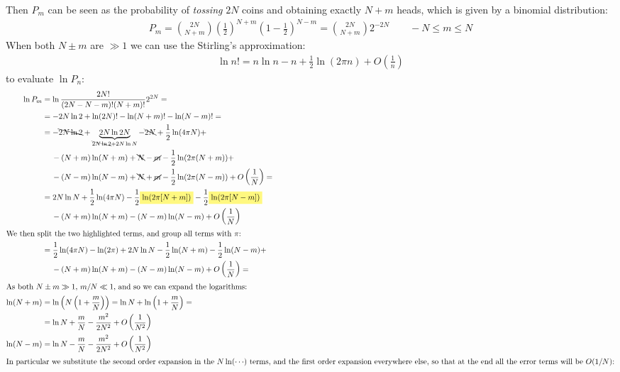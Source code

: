\documentclass[../../main.tex]{subfiles}
\begin{document}
Then $P_m$ can be seen as the probability of \textit{tossing} $2N$ coins and obtaining exactly $N+m$ heads, which is given by a binomial distribution:
\begin{align}\label{eqn:m-binomial}
    P_m = {2N \choose N+m} \left(\frac{1}{2} \right)^{N+m} \left(1-\frac{1}{2} \right)^{N-m} = {2N \choose N+m} 2^{-2N} \qquad -N \leq m \leq N 
\end{align}  
 When both $N\pm m$ are $\gg 1$ we can use the Stirling's approximation:
\begin{align}\label{eqn:stirling1}
    \ln n! = n \ln n - n  +\frac{1}{2} \ln (2 \pi n)  + O\left(\frac{1}{n} \right)
\end{align}
to evaluate $\ln P_n$:
\begin{align*}
    \ln P_m &= \ln \frac{2N!}{(2N-N-m)!(N+m)!} 2^{2N} =\\ 
    &= - 2N \ln 2 + \ln (2N)! - \ln (N+m)! - \ln (N-m)! = \\
    &= -\bcancel{2N \ln 2} + \underbrace{2 N \ln 2N}_{\bcancel{2 N \ln 2} + 2N\ln N} -\bcancel{ 2N} + \frac{1}{2} \ln(4 \pi N) +\\
    &\quad \> -(N+m)\ln(N+m) + \bcancel{N}-\cancel{m} - \frac{1}{2}\ln(2\pi(N+m)) + \\
    &\quad \> -(N-m) \ln(N-m) +\bcancel{N}+\cancel{m} - \frac{1}{2} \ln(2\pi(N-m)) + O\left(\frac{1}{N} \right)= \\
    &= 2 N \ln N + \frac{1}{2} \ln(4 \pi N) - \frac{1}{2} \hlc{Yellow}{\ln(2\pi[N+m])} - \frac{1}{2} \hlc{Yellow}{\ln(2\pi[N-m])}   \\
    &\quad \> -(N+m) \ln (N+m) - (N-m) \ln(N-m) + O\left(\frac{1}{N} \right)\\
\shortintertext{We then split the two highlighted terms, and group all terms with $\pi$:}
    &=\frac{1}{2} \ln(4 \pi N) - \ln(2 \pi) + 2 N \ln N - \frac{1}{2} \ln(N+m) -\frac{1}{2}\ln(N-m)+\\
    &\quad \> -(N+m)\ln(N+m) - (N-m) \ln(N-m) + O\left(\frac{1}{N} \right) =\\    
\shortintertext{As both $N \pm m \gg 1$, $m/N \ll 1$, and so we can expand the logarithms:}
\ln(N+m) &= \ln \left(N\left(1 + \frac{m}{N} \right)\right) = \ln N + \ln \left(1+\frac{m}{N} \right) =\\
&= \ln N +\frac{m}{N}-\frac{m^2}{2N^2} + O\left(\frac{1}{N^2} \right) \\
\ln(N-m) &= \ln N -\frac{m}{N} -\frac{m^2}{2N^2} + O\left(\frac{1}{N^2} \right)  \\
\shortintertext{In particular we substitute the second order expansion in the $N \ln(\cdots)$ terms, and the first order expansion everywhere else, so that at the end all the error terms will be $O(1/N)$:}

\end{align*}
\end{document}
